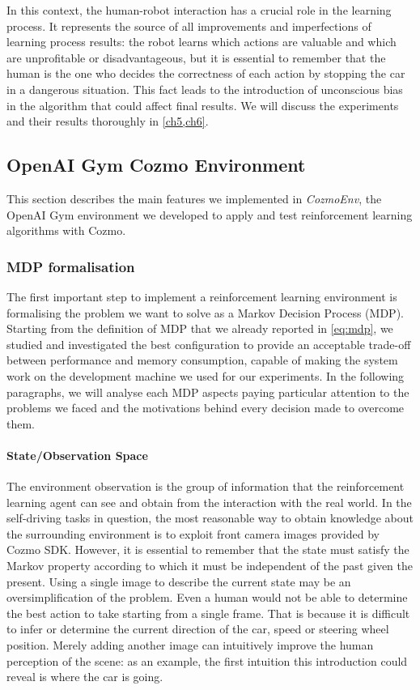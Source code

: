 In this context, the human-robot interaction has a crucial role in the learning process. It represents the source of all improvements and imperfections of learning process results: the robot learns which actions are valuable and which are unprofitable or disadvantageous, but it is essential to remember that the human is the one who decides the correctness of each action by stopping the car in a dangerous situation. This fact leads to the introduction of unconscious bias in the algorithm that could affect final results. We will discuss the experiments and their results thoroughly in \vref{ch5,ch6}.

\subsection{OpenAI Gym Cozmo Environment}

This section describes the main features we implemented in \textit{CozmoEnv}, the OpenAI Gym environment we developed to apply and test reinforcement learning algorithms with Cozmo.

\subsubsection{MDP formalisation}

The first important step to implement a reinforcement learning environment is formalising the problem we want to solve as a Markov Decision Process (MDP). Starting from the definition of MDP that we already reported in \vref{eq:mdp}, we studied and investigated the best configuration to provide an acceptable trade-off between performance and memory consumption, capable of making the system work on the development machine we used for our experiments. In the following paragraphs, we will analyse each MDP aspects paying particular attention to the problems we faced and the motivations behind every decision made to overcome them.

\paragraph{State/Observation Space} The environment observation is the group of information that the reinforcement learning agent can see and obtain from the interaction with the real world. In the self-driving tasks in question, the most reasonable way to obtain knowledge about the surrounding environment is to exploit front camera images provided by Cozmo SDK. However, it is essential to remember that the state must satisfy the Markov property according to which it must be independent of the past given the present. Using a single image to describe the current state may be an oversimplification of the problem. Even a human would not be able to determine the best action to take starting from a single frame. That is because it is difficult to infer or determine the current direction of the car, speed or steering wheel position. Merely adding another image can intuitively improve the human perception of the scene: as an example, the first intuition this introduction could reveal is where the car is going.


